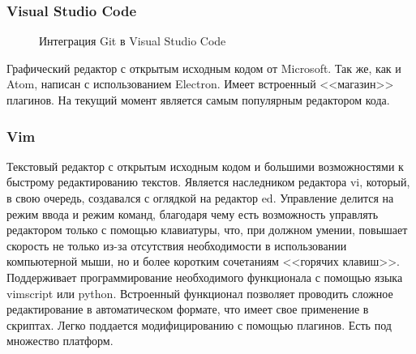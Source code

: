 \subsubsection{Visual Studio Code}\label{sec:ch2/sec1/sub2/sub4}
\begin{figure}[!htbp]
    \caption{Интеграция Git в Visual Studio Code\label{fig:vs-git}}
\end{figure}
Графический редактор с открытым исходным кодом от Microsoft.
Так же, как и Atom, написан с использованием Electron.
Имеет встроенный <<магазин>> плагинов. На текущий момент
является самым популярным редактором кода.

\subsubsection{Vim}\label{sec:ch2/sec1/sub2/sub5}
Текстовый редактор с открытым исходным кодом и большими возможностями к
быстрому редактированию текстов. Является наследником редактора vi, который, в свою
очередь, создавался с оглядкой на редактор ed. Управление делится на
режим ввода и режим команд, благодаря чему есть возможность управлять 
редактором только с помощью клавиатуры, что, при должном умении, повышает скорость
не только из-за отсутствия необходимости в использовании компьютерной мыши, но и
более коротким сочетаниям  <<горячих клавиш>>.
Поддерживает программирование необходимого функционала с помощью языка
vimscript или python. Встроенный функционал позволяет проводить сложное редактирование
в автоматическом формате, что имеет свое применение в скриптах.
Легко поддается модифицированию с помощью плагинов.
Есть под множество платформ.
\\

